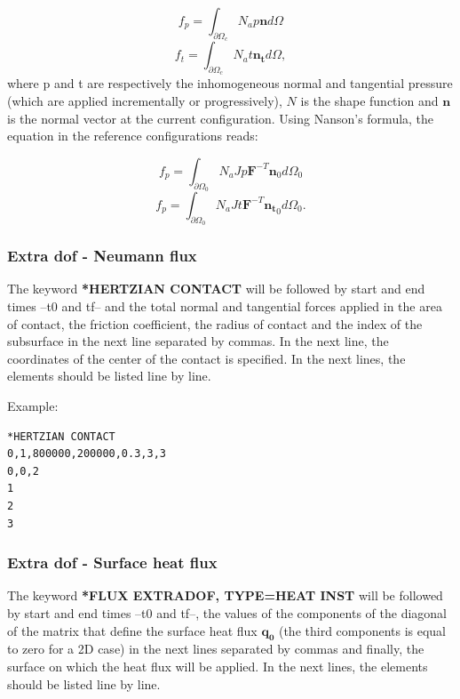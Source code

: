 \documentclass[oneside,11pt,times]{book}
\begin{document}
 \begin{equation}
f_p=\int_{\partial\Omega_c}N_ap\mathbf{n}d\Omega
\end{equation}
 \begin{equation}
f_t=\int_{\partial\Omega_c}N_at\mathbf{n_{t}}d\Omega,
\end{equation}
where p and t are respectively the inhomogeneous normal and tangential pressure (which are applied incrementally or progressively), $N$ is the shape function and $\mathbf{n}$ is the normal vector at the current configuration. Using Nanson's formula, the equation in the reference configurations reads:

\begin{equation}
f_p=\int_{\partial\Omega_0}N_aJp\mathbf{F}^{-T}\mathbf{n}_0d\Omega_0
\end{equation}
\begin{equation}
f_p=\int_{\partial\Omega_0}N_aJt\mathbf{F}^{-T}\mathbf{n_{t}}_0d\Omega_0.
\end{equation}

\subsubsection{Extra dof - Neumann flux}

The keyword \textbf{*HERTZIAN CONTACT} will be followed by start and end times --t0 and tf-- and the total normal and tangential forces applied in the area of contact, the friction coefficient, the radius of contact and the index of the subsurface in the next line separated by commas. In the next line, the coordinates of the center of the contact is specified. In the next lines, the elements should be listed line by line.

Example:
\begin{lstlisting}
*HERTZIAN CONTACT
0,1,800000,200000,0.3,3,3
0,0,2
1
2
3

\end{lstlisting}

\subsubsection{Extra dof - Surface heat flux}

The keyword \textbf{*FLUX EXTRADOF, TYPE=HEAT INST} will be followed by start and end times --t0 and tf--, the values of the components of the diagonal of the matrix that define the surface heat flux $\bm{q_0}$ (the third components is equal to zero for a 2D case) in the next lines separated by commas and finally, the surface on which the heat flux will be applied. In the next lines, the elements should be listed line by line.
\end{document}
